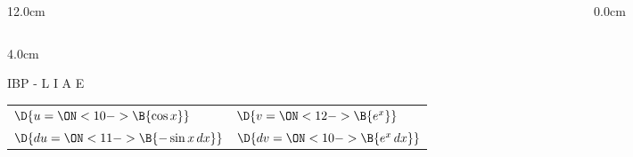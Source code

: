 \begin{frame}
\begin{columns}
\begin{column}{12.0cm}
\begin{columns}
\begin{column}{4.0cm}
\vspace{1.5cm}

IBP \quad - \quad L \quad I \quad A \quad {} \quad E
\setlength{\extrarowheight}{0.2cm}
\begin{tabular}{ p{1.8cm} p{1.8cm} }
	\hline
	$\D{u = \ON<10->{\B{\cos x}}}$ & 
	$\D{v = \ON<12->{\B{e^x}}}$ \\
	$\D{du = \ON<11->{\B{ -\sin x\, dx}}}$ & 
	$\D{dv = \ON<10->{\B{ e^x \, dx}}}$ \\
\end{tabular}
\end{column}
\end{columns}
	
\end{column}
\begin{column}{0.0cm}\end{column}
\end{columns}
\end{frame}

